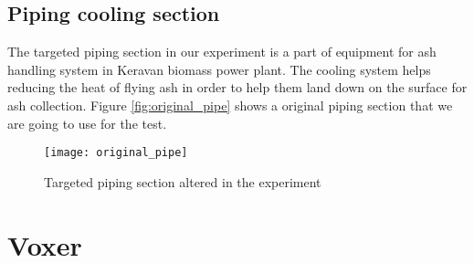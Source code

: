 \subsection{Piping cooling section}
The targeted piping section in our experiment is a part of equipment for ash handling system in Keravan biomass power plant. The cooling system helps reducing the heat of flying ash in order to help them land down on the surface for ash collection. Figure \vref{fig:original_pipe} shows a original piping section that we are going to use for the test. 

\begin{figure}[h]
  \centering
  \texttt{[image: original\_pipe]}
  \caption{ Targeted piping section altered in the experiment}
  \label{fig:original_pipe}
\end{figure}

\section{Voxer}
